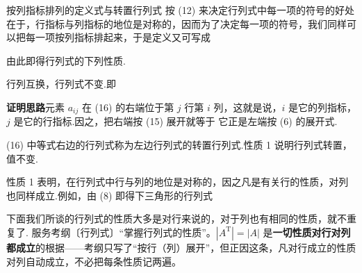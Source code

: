 \begin{fdeep}{按列指标排列的定义式与转置行列式}
按 (12) 来决定行列式中每一项的符号的好处在于，行指标与列指标的地位是对称的，因而为了决定每一项的符号，我们同样可以把每一项按列指标排起来，于是定义又可写成

由此即得行列式的下列性质.

\quad 行列互换，行列式不变.即

\textbf{证明思路}\quad 元素 $a_{ij}$ 在 (16) 的右端位于第 $j$ 行第 $i$ 列，这就是说，$i$ 是它的列指标，$j$ 是它的行指标.因之，把右端按 (15) 展开就等于
它正是左端按 (6) 的展开式.

(16) 中等式右边的行列式称为左边行列式的转置行列式.性质 1 说明行列式转置，值不变.

性质 1 表明，在行列式中行与列的地位是对称的，因之凡是有关行的性质，对列也同样成立.例如，由 (8) 即得下三角形的行列式

下面我们所谈的行列式的性质大多是对行来说的，对于列也有相同的性质，就不重复了.
\fbref{}服务考纲〔行列式〕“掌握行列式的性质”。$|A^{\mathrm T}|=|A|$ 是\textbf{一切性质对行对列都成立}的根据——考纲只写了“按行（列）展开”，但正因这条，凡对行成立的性质对列自动成立，不必把每条性质记两遍。
\end{fdeep}

